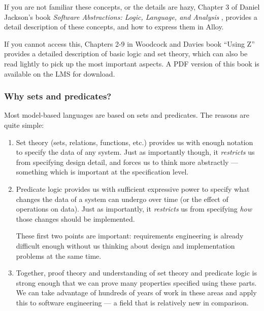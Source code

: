 If you are not familiar these concepts, or the details are hazy, Chapter 3 of Daniel Jackson's book \emph{Software Abstractions: Logic, Language, and Analysis} \cite{jackson2012software}, provides a detail description of these concepts, and how to express them in Alloy.

If you cannot access this, Chapters 2-9 in Woodcock and Davies book ``Using Z'' \cite{woodcock-using-z} provides a detailed description of basic logic and set theory, which can also be read lightly to pick up the most important aspects. A PDF version of this book is available on the LMS for download.

\subsubsection{Why sets and predicates?}

Most model-based languages are based on sets and predicates. The reasons are quite simple: 

\begin{enumerate}

 \item Set theory (sets, relations, functions, etc.) provides us with enough notation to specify the data of any system. Just as importantly though, it \emph{restricts} us from specifying design detail, and forces us to think more abstractly --- something which is important at the specification level. 

 \item Predicate logic provides us with sufficient expressive power to specify what changes the data of a system can undergo over time (or the effect of operations on data). Just as importantly, it \emph{restricts} us from specifying \emph{how} those changes should be implemented.

These first two points are important: requirements engineering is already difficult enough without us thinking about design and implementation problems at the same time.

 \item Together, proof theory and understanding of set theory and predicate logic is strong enough that we can prove many properties specified using these parts. We can take advantage of hundreds of years of work in these areas and apply this to software engineering --- a field that is relatively new in comparison.

\end{enumerate}



